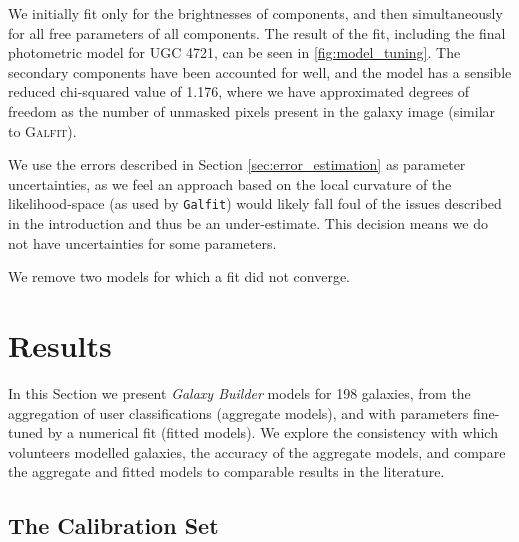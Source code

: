 \documentclass[trackchanges]{aastex63}
\begin{document}
We initially fit only for the brightnesses of components, and then simultaneously for all free parameters of all components. The result of the fit, including the final photometric model for UGC 4721, can be seen in \ref{fig:model_tuning}. The secondary components have been accounted for well, and the model has a sensible reduced chi-squared value of 1.176, where we have approximated degrees of freedom as the number of unmasked pixels present in the galaxy image (similar to \textsc{Galfit}).

\begin{figure*}
  \caption{Effect of fitting on the aggregated models. The top left panel shows an Arcsinh-scaled image of the galaxy being fit (UGC 4721), the top middle shows the final model obtained (with the same limits and scaling as the galaxy image) and the top right shows the difference between the two images, in units of pixel uncertainty. The bottom panels show a simple representation of the model before and after tuning, overlaid on the galaxy image from the top-left panel. With minimal change to the aggregated components, we recover a detailed model that matches the galaxy exceptionally well, as evident in the residuals.}
  \label{fig:model_tuning}
\end{figure*}

We use the errors described in Section \ref{sec:error_estimation} as parameter uncertainties, as we feel an approach based on the local curvature of the likelihood-space (as used by \texttt{Galfit}) would likely fall foul of the issues described in the introduction and thus be an under-estimate. This decision means we do not have uncertainties for some parameters.

We remove two models for which a fit did not converge.


\section{Results}
\label{sec:results}

In this Section we present \textit{Galaxy Builder} models for 198 galaxies, from the aggregation of user classifications (aggregate models), and with parameters fine-tuned by a numerical fit (fitted models). We explore the consistency with which volunteers modelled galaxies, the accuracy of the aggregate models, and compare the aggregate and fitted models to comparable results in the literature.

\subsection{The Calibration Set}
\label{sec:calibration-set-results}
\end{document}
